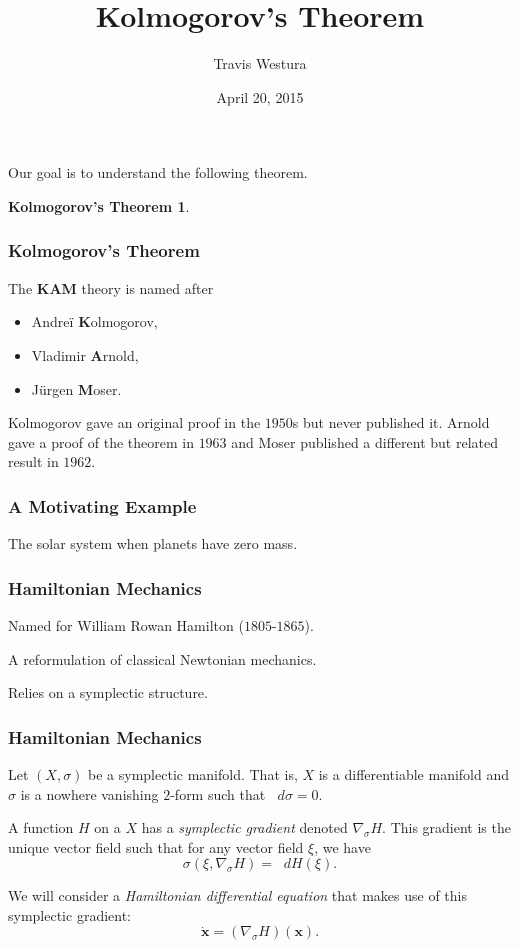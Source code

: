 \documentclass{beamer}
\title[KAM]{Kolmogorov's Theorem}
\author{Travis Westura}
\institute{Cornell University}
\date{April 20, 2015}
\newcommand{\bp}[1]{\bm{#1}}
\newcommand{\bd}[1]{\bm{\dot{#1}}}
\newcommand{\sgrad}{\nabla_{\sigma}}
\newcommand{\dif}{\mathop{}\!{d}}
\begin{document}
\frame{\titlepage}

\begin{frame}
  Our goal is to understand the following theorem.
  \newtheorem{kamthm}{Kolmogorov's Theorem}
  \begin{kamthm}
    \KAM
  \end{kamthm}
\end{frame}

\begin{frame}
  \frametitle{Kolmogorov's Theorem}
  The \textbf{KAM} theory is named after
  \begin{itemize}
    \item Andre{\"i} \textbf{K}olmogorov,
    \item Vladimir \textbf{A}rnold,
    \item J{\"u}rgen \textbf{M}oser.
  \end{itemize}
  Kolmogorov gave an original proof in the $1950$s but never published it.
  Arnold gave a proof of the theorem in $1963$ and Moser published a different
  but related result in $1962$.
\end{frame}

\begin{frame}
  \frametitle{A Motivating Example}
  The solar system when planets have zero mass.
\end{frame}

\begin{frame}
  \frametitle{Hamiltonian Mechanics}
  Named for William Rowan Hamilton ($1805$-$1865$).

  A reformulation of classical Newtonian mechanics.

  Relies on a symplectic structure.
\end{frame}

\begin{frame}
  \frametitle{Hamiltonian Mechanics}
  Let $(X, \sigma)$ be a symplectic manifold.
  That is, $X$ is a differentiable manifold and $\sigma$ is a nowhere vanishing
  $2$-form such that $\dif \sigma = 0$.

  A function $H$ on a $X$ has a \emph{symplectic gradient} denoted $\sgrad H$.
  This gradient is the unique vector field such that for any vector field $\xi$,
  we have
  \begin{equation*}
    \sigma(\xi, \sgrad H) = \dif H(\xi).
  \end{equation*}

  We will consider a \emph{Hamiltonian differential equation} that makes use of
  this symplectic gradient:
  \begin{equation*}
    \bd{x} = (\sgrad H)(\bp{x}).
  \end{equation*}
\end{frame}
\end{document}
